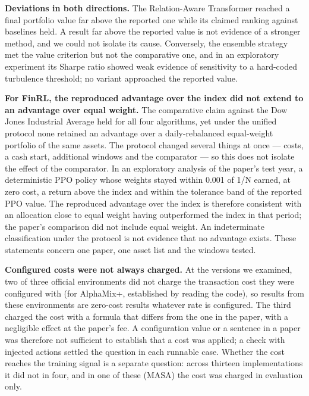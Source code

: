 \documentclass[12pt,a4paper]{report}
\newcounter{none} %
\begin{document}
\textbf{Deviations in both directions.} The Relation-Aware Transformer
reached a final portfolio value far above the reported one while its
claimed ranking against baselines held. A result far above the reported
value is not evidence of a stronger method, and we could not isolate its
cause. Conversely, the ensemble strategy met the value criterion but not
the comparative one, and in an exploratory experiment its Sharpe ratio
showed weak evidence of sensitivity to a hard-coded turbulence
threshold; no variant approached the reported value.

\textbf{For FinRL, the reproduced advantage over the index did not
extend to an advantage over equal weight.} The comparative claim against
the Dow Jones Industrial Average held for all four algorithms, yet under
the unified protocol none retained an advantage over a daily-rebalanced
equal-weight portfolio of the same assets. The protocol changed several
things at once --- costs, a cash start, additional windows and the
comparator --- so this does not isolate the effect of the comparator. In
an exploratory analysis of the paper's test year, a deterministic PPO
policy whose weights stayed within 0.001 of 1/N earned, at zero cost, a
return above the index and within the tolerance band of the reported PPO
value. The reproduced advantage over the index is therefore consistent
with an allocation close to equal weight having outperformed the index
in that period; the paper's comparison did not include equal weight. An
indeterminate classification under the protocol is not evidence that no
advantage exists. These statements concern one paper, one asset list and
the windows tested.

\textbf{Configured costs were not always charged.} At the versions we
examined, two of three official environments did not charge the
transaction cost they were configured with (for AlphaMix+, established
by reading the code), so results from these environments are zero-cost
results whatever rate is configured. The third charged the cost with a
formula that differs from the one in the paper, with a negligible effect
at the paper's fee. A configuration value or a sentence in a paper was
therefore not sufficient to establish that a cost was applied; a check
with injected actions settled the question in each runnable case.
Whether the cost reaches the training signal is a separate question:
across thirteen implementations it did not in four, and in one of these
(MASA) the cost was charged in evaluation only.
\end{document}
